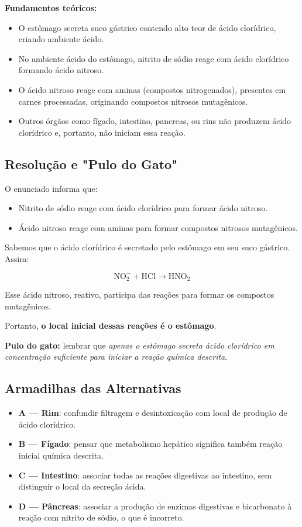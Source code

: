 \documentclass{article}
\begin{document}
\bigskip

\textbf{Fundamentos teóricos:}

\begin{itemize}
  \item O estômago secreta suco gástrico contendo alto teor de ácido clorídrico, criando ambiente ácido.
  \item No ambiente ácido do estômago, nitrito de sódio reage com ácido clorídrico formando ácido nitroso.
  \item O ácido nitroso reage com aminas (compostos nitrogenados), presentes em carnes processadas, originando compostos nitrosos mutagênicos.
  \item Outros órgãos como fígado, intestino, pancreas, ou rins não produzem ácido clorídrico e, portanto, não iniciam essa reação.
\end{itemize}

\subsection*{Resolução e "Pulo do Gato"}

O enunciado informa que:
\begin{itemize}
  \item Nitrito de sódio reage com ácido clorídrico para formar ácido nitroso.
  \item Ácido nitroso reage com aminas para formar compostos nitrosos mutagênicos.
\end{itemize}

Sabemos que o ácido clorídrico é secretado pelo estômago em seu suco gástrico. Assim:

\begin{equation*}
\mathrm{NO_2^- + HCl \rightarrow HNO_2}
\end{equation*}

Esse ácido nitroso, reativo, participa das reações para formar os compostos mutagênicos.

Portanto, \textbf{o local inicial dessas reações é o estômago}.

\textbf{Pulo do gato:} lembrar que \textit{apenas o estômago secreta ácido clorídrico em concentração suficiente para iniciar a reação química descrita}.

\subsection*{Armadilhas das Alternativas}

\begin{itemize}
  \item \textbf{A — Rim}: confundir filtragem e desintoxicação com local de produção de ácido clorídrico.
  \item \textbf{B — Fígado}: pensar que metabolismo hepático significa também reação inicial química descrita.
  \item \textbf{C — Intestino}: associar todas as reações digestivas ao intestino, sem distinguir o local da secreção ácida.
  \item \textbf{D — Pâncreas}: associar a produção de enzimas digestivas e bicarbonato à reação com nitrito de sódio, o que é incorreto.
\end{itemize}
\end{document}
